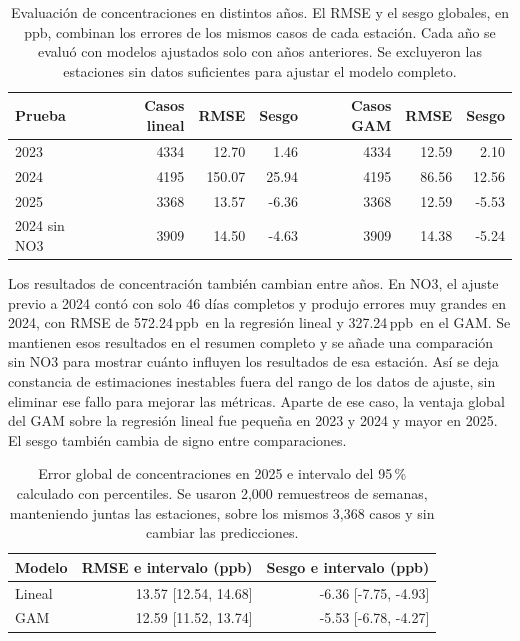 \documentclass[11pt,letterpaper]{article}
\newcommand{\ppb}{\,ppb}
\newenvironment{cambio}{}{}
\begin{document}
\begin{table}[H]
\begin{cambio}\centering\small
\begin{tabular}{@{}lrrrrrr@{}}\toprule
Prueba & Casos lineal & RMSE & Sesgo & Casos GAM & RMSE & Sesgo\\\midrule
2023 & 4334 & 12.70 & 1.46 & 4334 & 12.59 & 2.10\\
2024 & 4195 & 150.07 & 25.94 & 4195 & 86.56 & 12.56\\
2025 & 3368 & 13.57 & -6.36 & 3368 & 12.59 & -5.53\\
2024 sin NO3 & 3909 & 14.50 & -4.63 & 3909 & 14.38 & -5.24\\
\bottomrule\end{tabular}
\caption{Evaluación de concentraciones en distintos años. El RMSE y el sesgo globales, en ppb, combinan los errores de los mismos casos de cada estación. Cada año se evaluó con modelos ajustados solo con años anteriores. Se excluyeron las estaciones sin datos suficientes para ajustar el modelo completo.}\label{tab:concentraciones_temporales}
\end{cambio}
\end{table}
\begin{cambio}
Los resultados de concentración también cambian entre años. En NO3, el ajuste previo a 2024 contó con solo 46 días completos y produjo errores muy grandes en 2024, con RMSE de 572.24\ppb\ en la regresión lineal y 327.24\ppb\ en el GAM. Se mantienen esos resultados en el resumen completo y se añade una comparación sin NO3 para mostrar cuánto influyen los resultados de esa estación. Así se deja constancia de estimaciones inestables fuera del rango de los datos de ajuste, sin eliminar ese fallo para mejorar las métricas. Aparte de ese caso, la ventaja global del GAM sobre la regresión lineal fue pequeña en 2023 y 2024 y mayor en 2025. El sesgo también cambia de signo entre comparaciones.
\end{cambio}
\begin{table}[H]
\begin{cambio}\centering\small
\begin{tabular}{@{}lrr@{}}\toprule
Modelo & RMSE e intervalo (ppb) & Sesgo e intervalo (ppb)\\\midrule
Lineal & 13.57 [12.54, 14.68] & -6.36 [-7.75, -4.93]\\
GAM & 12.59 [11.52, 13.74] & -5.53 [-6.78, -4.27]\\
\bottomrule\end{tabular}
\caption{Error global de concentraciones en 2025 e intervalo del 95\,\% calculado con percentiles. Se usaron 2,000 remuestreos de semanas, manteniendo juntas las estaciones, sobre los mismos 3,368 casos y sin cambiar las predicciones.}\label{tab:intervalos_concentraciones}
\end{cambio}
\end{table}
\end{document}
